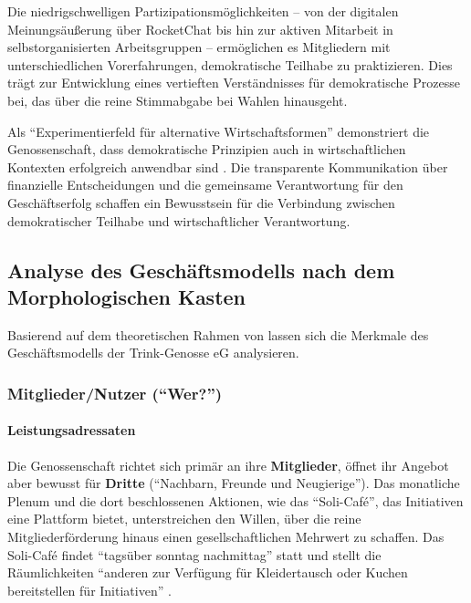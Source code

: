 Die niedrigschwelligen Partizipationsmöglichkeiten – von der digitalen Meinungsäußerung über RocketChat bis hin zur aktiven Mitarbeit in selbstorganisierten Arbeitsgruppen – ermöglichen es Mitgliedern mit unterschiedlichen Vorerfahrungen, demokratische Teilhabe zu praktizieren. Dies trägt zur Entwicklung eines vertieften Verständnisses für demokratische Prozesse bei, das über die reine Stimmabgabe bei Wahlen hinausgeht.

Als \enquote{Experimentierfeld für alternative Wirtschaftsformen} demonstriert die Genossenschaft, dass demokratische Prinzipien auch in wirtschaftlichen Kontexten erfolgreich anwendbar sind \parencite{GenossenschaftsartikelUeberTrinkGenosse2022}. Die transparente Kommunikation über finanzielle Entscheidungen und die gemeinsame Verantwortung für den Geschäftserfolg schaffen ein Bewusstsein für die Verbindung zwischen demokratischer Teilhabe und wirtschaftlicher Verantwortung.

\subsection{Analyse des Geschäftsmodells nach dem Morphologischen Kasten}

Basierend auf dem theoretischen Rahmen von \textcite{blome-dreesGenossenschaftlicheGeschaeftsmodelleSemantik2023} lassen sich die Merkmale des Geschäftsmodells der Trink-Genosse eG analysieren.



\subsubsection{Mitglieder/Nutzer (\enquote{Wer?})}

\paragraph{Leistungsadressaten}
Die Genossenschaft richtet sich primär an ihre \textbf{Mitglieder}, öffnet ihr Angebot aber bewusst für \textbf{Dritte} (\enquote{Nachbarn, Freunde und Neugierige}). Das monatliche Plenum und die dort beschlossenen Aktionen, wie das \enquote{Soli-Café}, das Initiativen eine Plattform bietet, unterstreichen den Willen, über die reine Mitgliederförderung hinaus einen gesellschaftlichen Mehrwert zu schaffen. Das Soli-Café findet \enquote{tagsüber sonntag nachmittag} statt und stellt die Räumlichkeiten \enquote{anderen zur Verfügung für Kleidertausch oder Kuchen bereitstellen für Initiativen} \parencite{mederInterviewZurGeschaftsmodellanalyse2025}.

